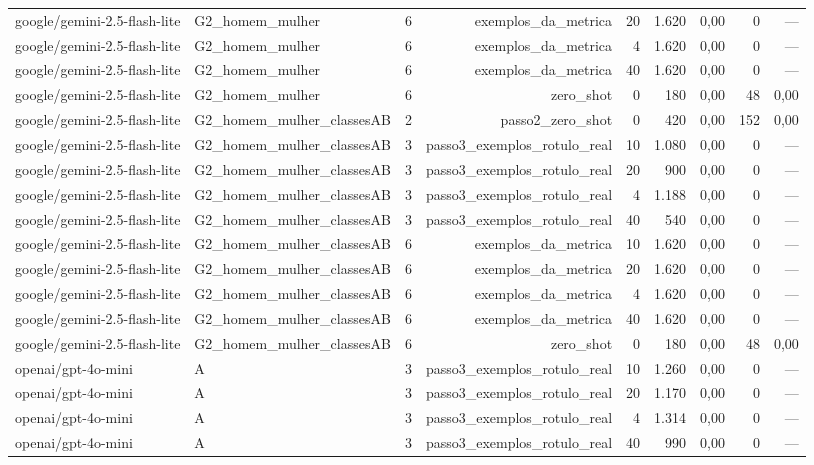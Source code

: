 \begin{table}[htbp]
\begin{tabular}{lllrrrrrr}
google/gemini-2.5-flash-lite & G2\_homem\_mulher & 6 & exemplos\_da\_metrica & 20 & 1.620 & 0,00 & 0 & — \\
google/gemini-2.5-flash-lite & G2\_homem\_mulher & 6 & exemplos\_da\_metrica & 4 & 1.620 & 0,00 & 0 & — \\
google/gemini-2.5-flash-lite & G2\_homem\_mulher & 6 & exemplos\_da\_metrica & 40 & 1.620 & 0,00 & 0 & — \\
google/gemini-2.5-flash-lite & G2\_homem\_mulher & 6 & zero\_shot & 0 & 180 & 0,00 & 48 & 0,00 \\
google/gemini-2.5-flash-lite & G2\_homem\_mulher\_classesAB & 2 & passo2\_zero\_shot & 0 & 420 & 0,00 & 152 & 0,00 \\
google/gemini-2.5-flash-lite & G2\_homem\_mulher\_classesAB & 3 & passo3\_exemplos\_rotulo\_real & 10 & 1.080 & 0,00 & 0 & — \\
google/gemini-2.5-flash-lite & G2\_homem\_mulher\_classesAB & 3 & passo3\_exemplos\_rotulo\_real & 20 & 900 & 0,00 & 0 & — \\
google/gemini-2.5-flash-lite & G2\_homem\_mulher\_classesAB & 3 & passo3\_exemplos\_rotulo\_real & 4 & 1.188 & 0,00 & 0 & — \\
google/gemini-2.5-flash-lite & G2\_homem\_mulher\_classesAB & 3 & passo3\_exemplos\_rotulo\_real & 40 & 540 & 0,00 & 0 & — \\
google/gemini-2.5-flash-lite & G2\_homem\_mulher\_classesAB & 6 & exemplos\_da\_metrica & 10 & 1.620 & 0,00 & 0 & — \\
google/gemini-2.5-flash-lite & G2\_homem\_mulher\_classesAB & 6 & exemplos\_da\_metrica & 20 & 1.620 & 0,00 & 0 & — \\
google/gemini-2.5-flash-lite & G2\_homem\_mulher\_classesAB & 6 & exemplos\_da\_metrica & 4 & 1.620 & 0,00 & 0 & — \\
google/gemini-2.5-flash-lite & G2\_homem\_mulher\_classesAB & 6 & exemplos\_da\_metrica & 40 & 1.620 & 0,00 & 0 & — \\
google/gemini-2.5-flash-lite & G2\_homem\_mulher\_classesAB & 6 & zero\_shot & 0 & 180 & 0,00 & 48 & 0,00 \\
openai/gpt-4o-mini & A & 3 & passo3\_exemplos\_rotulo\_real & 10 & 1.260 & 0,00 & 0 & — \\
openai/gpt-4o-mini & A & 3 & passo3\_exemplos\_rotulo\_real & 20 & 1.170 & 0,00 & 0 & — \\
openai/gpt-4o-mini & A & 3 & passo3\_exemplos\_rotulo\_real & 4 & 1.314 & 0,00 & 0 & — \\
openai/gpt-4o-mini & A & 3 & passo3\_exemplos\_rotulo\_real & 40 & 990 & 0,00 & 0 & — \\

\end{tabular}
\end{table}
